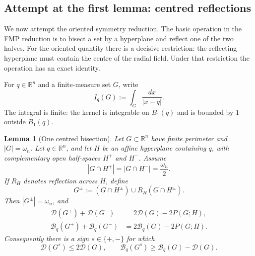 \documentclass[11pt]{amsart}
\newtheorem{lemma}[theorem]{Lemma}
\theoremstyle{definition}
\newcommand{\R}{\mathbb R}
\newcommand{\Per}{P}
\newcommand{\Def}{\mathcal D}
\begin{document}
\subsection{Attempt at the first lemma: centred reflections}

We now attempt the oriented symmetry reduction.  The basic operation in
the FMP reduction is to bisect a set by a hyperplane and reflect one of
the two halves.  For the oriented quantity there is a decisive
restriction: the reflecting hyperplane must contain the centre of the
radial field.  Under that restriction the operation has an exact
identity.

For \(q\in\R^n\) and a finite-measure set \(G\), write
\[
   I_q(G):=\int_G\frac{dx}{|x-q|}.
\]
The integral is finite: the kernel is integrable on \(B_1(q)\) and is
bounded by \(1\) outside \(B_1(q)\).

\begin{lemma}[One centred bisection]\label{lem:one-centred-bisection}
Let \(G\subset\R^n\) have finite perimeter and
\(|G|=\omega_n\).  Let \(q\in\R^n\), and let \(H\) be an affine
hyperplane containing \(q\), with complementary open half-spaces
\(H^+\) and \(H^-\).  Assume
\[
   |G\cap H^+|=|G\cap H^-|=\frac{\omega_n}{2}.
\tag{6.7a}\label{eq:centred-cut-assumptions}
\]
If \(R_H\) denotes reflection across \(H\), define
\[
   G^\pm:=(G\cap H^\pm)\cup R_H(G\cap H^\pm).
\]
Then \(|G^\pm|=\omega_n\), and
\[
\begin{aligned}
   \Def(G^+)+\Def(G^-)&=2\Def(G)-2\Per(G;H),\\
   \mathcal B_q(G^+)+\mathcal B_q(G^-)
      &=2\mathcal B_q(G)-2\Per(G;H).
\end{aligned}
\tag{6.7b}\label{eq:centred-cut-identities}
\]
Consequently there is a sign \(s\in\{+,-\}\) for which
\[
   \Def(G^s)\le2\Def(G),
   \qquad
   \mathcal B_q(G^s)\ge\mathcal B_q(G)-\Def(G).
\tag{6.7c}\label{eq:centred-cut-choice}
\]
\end{lemma}
\end{document}
